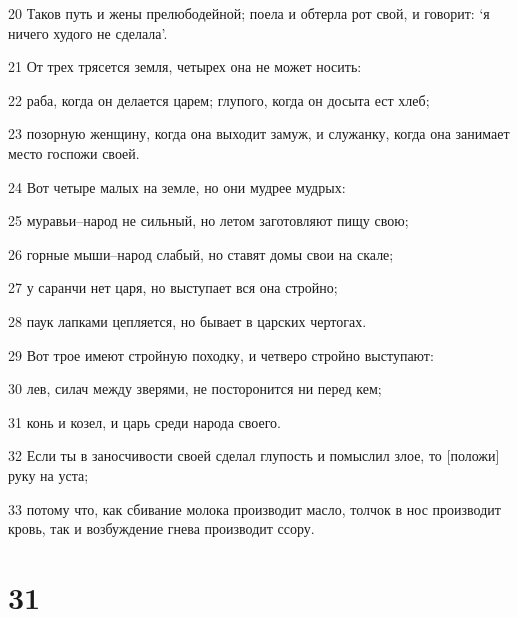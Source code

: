 \par 20 Таков путь и жены прелюбодейной; поела и обтерла рот свой, и говорит: `я ничего худого не сделала'.
\par 21 От трех трясется земля, четырех она не может носить:
\par 22 раба, когда он делается царем; глупого, когда он досыта ест хлеб;
\par 23 позорную женщину, когда она выходит замуж, и служанку, когда она занимает место госпожи своей.
\par 24 Вот четыре малых на земле, но они мудрее мудрых:
\par 25 муравьи--народ не сильный, но летом заготовляют пищу свою;
\par 26 горные мыши--народ слабый, но ставят домы свои на скале;
\par 27 у саранчи нет царя, но выступает вся она стройно;
\par 28 паук лапками цепляется, но бывает в царских чертогах.
\par 29 Вот трое имеют стройную походку, и четверо стройно выступают:
\par 30 лев, силач между зверями, не посторонится ни перед кем;
\par 31 конь и козел, и царь среди народа своего.
\par 32 Если ты в заносчивости своей сделал глупость и помыслил злое, то [положи] руку на уста;
\par 33 потому что, как сбивание молока производит масло, толчок в нос производит кровь, так и возбуждение гнева производит ссору.

\chapter{31}

